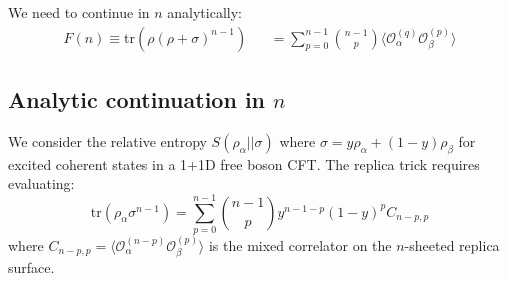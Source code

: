 \documentclass[11pt]{article}
\begin{document}
  We need to continue in $n$ analytically:
  \begin{eqnarray}
    \label{Fn} F(n)\equiv \text{tr}(\rho(\rho+\sigma)^{n-1}) &&= \sum_{p=0}^{n-1}
    \binom{n-1}{p} \langle \mathcal{O}_{\alpha}^{(q)} \mathcal{O}_{\beta}^{(p)} \rangle
  \end{eqnarray}

  \subsection{Analytic continuation in $n$}

  We consider the relative entropy $S(\rho_{\alpha}|| \sigma)$ where
  $\sigma = y \rho_{\alpha}+ (1-y)\rho_{\beta}$ for excited coherent states in a
  1+1D free boson CFT. The replica trick requires evaluating:
  \begin{equation}
    \text{tr}(\rho_{\alpha}\sigma^{n-1}) = \sum_{p=0}^{n-1}\binom{n-1}{p}y^{n-1-p}
    (1-y)^{p}C_{n-p, p}
  \end{equation}
  where
  $C_{n-p, p}= \langle \mathcal{O}_{\alpha}^{(n-p)}\mathcal{O}_{\beta}^{(p)}\rangle$
  is the mixed correlator on the $n$-sheeted replica surface.
\end{document}
